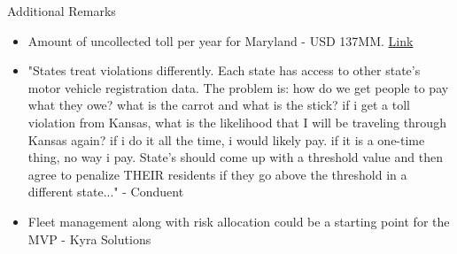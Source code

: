 \documentclass[border=10pt, xcolor={dvipsnames}]{beamer}
\begin{document}
\begin{frame}{Additional Remarks}
  \begin{itemize}
    \item Amount of uncollected toll per year for Maryland - USD 137MM. {\href{https://www.washingtonpost.com/transportation/2021/05/01/maryland-unpaid-tolls-out-state-drivers/?wpisrc=nl_sb_smartbrief}{Link}}
    \item "States treat violations differently. Each state has access to other state's motor vehicle registration data. The problem is:  how do we get people to pay what they owe?  what is the carrot and what is the stick?  if i get a toll violation from Kansas, what is the likelihood that I will be traveling through Kansas again?  if i do it all the time, i would likely pay.  if it is a one-time thing, no way i pay.  State's should come up with a threshold value and then agree to penalize THEIR residents if they go above the threshold in a different state..." - Conduent 
    \item Fleet management along with risk allocation could be a starting point for the MVP - Kyra Solutions
  \end{itemize}
\end{frame}
{\1
  \begin{frame}
  \end{frame}
}
\end{document}
